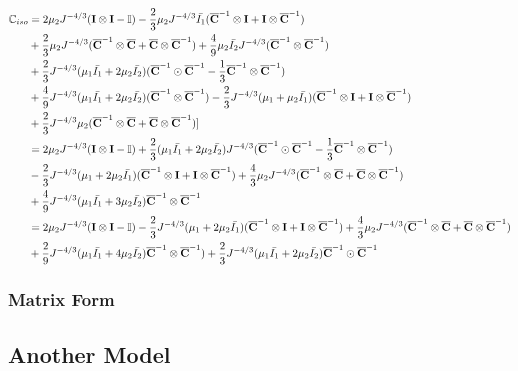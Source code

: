 \begin{equation} \label{mCiso}
\begin{split}
\mathbb{C}_{iso} 
&= 
2\mu_2{J}^{-4/3}(\bold{I} \otimes \bold{I} - \mathbb{I}) - \frac{2}{3}\mu_2J^{-4/3}\bar{I_1}({\overline{\bold{C}}}^{-1} \otimes \bold{I} + \bold{I} \otimes {\overline{\bold{C}}}^{-1}) \\
&+
\frac{2}{3}\mu_2J^{-4/3}({\overline{\bold{C}}}^{-1} \otimes {\overline{\bold{C}}} + {\overline{\bold{C}}} \otimes {\overline{\bold{C}}}^{-1}) + \frac{4}{9}\mu_2\bar{I_2}J^{-4/3}({\overline{\bold{C}}}^{-1} \otimes {\overline{\bold{C}}}^{-1}) \\
&+
\frac{2}{3}J^{-4/3}(\mu_1\bar{I_1} + 2\mu_2\bar{I_2})({\overline{\bold{C}}}^{-1} \odot {{\overline{\bold{C}}}}^{-1} - \frac{1}{3}{{\overline{\bold{C}}}}^{-1} \otimes {\overline{{\bold{C}}}}^{-1}) \\
&+
\frac{4}{9}J^{-4/3} (\mu_1\bar{I_1} + 2\mu_2\bar{I_2})({\overline{\bold{C}}}^{-1} \otimes {\overline{\bold{C}}}^{-1}) - \frac{2}{3}J^{-4/3}(\mu_1+\mu_2\bar{I_1})({\overline{\bold{C}}}^{-1} \otimes \bold{I} + \bold{I} \otimes {\overline{\bold{C}}}^{-1})\\
&+ \frac{2}{3}J^{-4/3}\mu_2({\overline{\bold{C}}}^{-1} \otimes {\overline{\bold{C}}}+{\overline{\bold{C}}} \otimes {\overline{\bold{C}}}^{-1}) ] \\
&=
2\mu_2{J}^{-4/3}(\bold{I} \otimes \bold{I} - \mathbb{I}) + \frac{2}{3}(\mu_1\bar{I_1} + 2\mu_2\bar{I_2})J^{-4/3}({\overline{\bold{C}}}^{-1} \odot {\overline{\bold{C}}}^{-1} - \frac{1}{3}{\overline{\bold{C}}}^{-1} \otimes {\overline{\bold{C}}}^{-1}) \\
&-
\frac{2}{3}J^{-4/3}(\mu_1 + 2\mu_2\bar{I_1})({\overline{\bold{C}}}^{-1} \otimes \bold{I} + \bold{I} \otimes {\overline{\bold{C}}}^{-1}) + \frac{4}{3}\mu_2J^{-4/3}({\overline{\bold{C}}}^{-1} \otimes {\overline{\bold{C}}} + {\overline{\bold{C}}} \otimes {\overline{\bold{C}}}^{-1}) \\
&+
\frac{4}{9}J^{-4/3}(\mu_1\bar{I_1} + 3\mu_2\bar{I_2}){\overline{\bold{C}}}^{-1} \otimes {\overline{\bold{C}}}^{-1} \\
&=
2\mu_2{J}^{-4/3}(\bold{I} \otimes \bold{I} - \mathbb{I}) - \frac{2}{3}J^{-4/3}(\mu_1 + 2\mu_2\bar{I_1})({\overline{\bold{C}}}^{-1} \otimes \bold{I} + \bold{I} \otimes {\overline{\bold{C}}}^{-1}) + \frac{4}{3}\mu_2J^{-4/3}({\overline{\bold{C}}}^{-1} \otimes {\overline{\bold{C}}} + {\overline{\bold{C}}} \otimes {\overline{\bold{C}}}^{-1}) \\
&+
\frac{2}{9}J^{-4/3}(\mu_1\bar{I_1} + 4\mu_2\bar{I_2}) {\overline{\bold{C}}}^{-1} \otimes {\overline{\bold{C}}}^{-1}) + \frac{2}{3}J^{-4/3}(\mu_1\bar{I_1} + 2\mu_2\bar{I_2}){\overline{\bold{C}}}^{-1} \odot {\overline{\bold{C}}}^{-1} 
\end{split}
\end{equation} 

%
\subsubsection{Matrix Form}

%
\subsection{Another Model}








